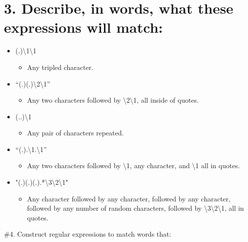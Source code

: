 \documentclass[
]{article}
\providecommand{\tightlist}{%
  \setlength{\itemsep}{0pt}\setlength{\parskip}{0pt}}
\begin{document}
\hypertarget{describe-in-words-what-these-expressions-will-match}{%
\section{3. Describe, in words, what these expressions will
match:}\label{describe-in-words-what-these-expressions-will-match}}

\begin{itemize}
\tightlist
\item
  (.)\textbackslash1\textbackslash1

  \begin{itemize}
  \tightlist
  \item
    Any tripled character.
  \end{itemize}
\item
  ``(.)(.)\textbackslash2\textbackslash1''

  \begin{itemize}
  \tightlist
  \item
    Any two characters followed by \textbackslash2\textbackslash1, all
    inside of quotes.
  \end{itemize}
\item
  (..)\textbackslash1

  \begin{itemize}
  \tightlist
  \item
    Any pair of characters repeated.
  \end{itemize}
\item
  ``(.).\textbackslash1.\textbackslash1''

  \begin{itemize}
  \tightlist
  \item
    Any two characters followed by \textbackslash1, any character, and
    \textbackslash1 all in quotes.
  \end{itemize}
\item
  "(.)(.)(.).*\textbackslash3\textbackslash2\textbackslash1"

  \begin{itemize}
  \tightlist
  \item
    Any character followed by any character, followed by any character,
    followed by any number of random characters, followed by
    \textbackslash3\textbackslash2\textbackslash1, all in quotes.
  \end{itemize}
\end{itemize}

\#4. Construct regular expressions to match words that:
\end{document}
